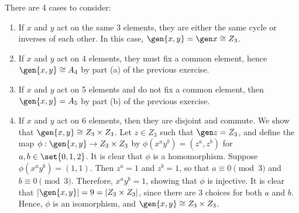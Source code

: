 \begin{sol}
    There are 4 cases to consider:
    \begin{enumerate}
        \item If $x$ and $y$ act on the same 3 elements, they are either the same cycle or inverses of each other.
		In this case, $\gen{x, y} = \gen x \cong Z_3$.
        \item If $x$ and $y$ act on 4 elements, they must fix a common element, hence $\gen{x, y} \cong A_4$ by part (a) of the previous exercise.
        \item If $x$ and $y$ act on 5 elements and do not fix a common element, then $\gen{x, y} = A_5$ by part (b) of the previous exercise.
        \item If $x$ and $y$ act on 6 elements, then they are disjoint and commute.
		We show that $\gen{x, y} \cong Z_3 \times Z_3$.
		Let $z \in Z_3$ such that $\gen z = Z_3$, and define the map $\phi : \gen{x, y} \to Z_3 \times Z_3$ by $\phi(x^a y^b) = (z^a, z^b)$ for $a, b \in \set{0, 1, 2}$.
		It is clear that $\phi$ is a homomorphism.
		Suppose $\phi(x^a y^b) = (1, 1)$.
		Then $z^a = 1$ and $z^b = 1$, so that $a \equiv 0 \pmod 3$ and $b \equiv 0 \pmod 3$.
		Therefore, $x^a y^b = 1$, showing that $\phi$ is injective.
		It is clear that $|\gen{x, y}| = 9 = |Z_3 \times Z_3|$, since there are 3 choices for both $a$ and $b$.
		Hence, $\phi$ is an isomorphism, and $\gen{x, y} \cong Z_3 \times Z_3$. \qedhere
    \end{enumerate}
\end{sol}